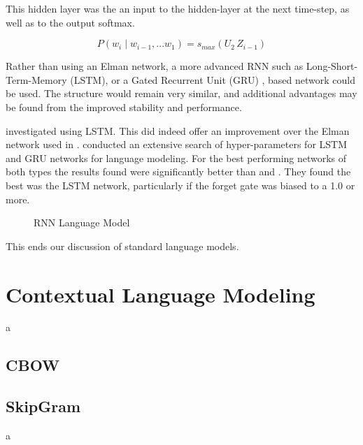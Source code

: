 \documentclass[parskip]{komatufte}
\begin{document}
This hidden layer was the an input to the hidden-layer at the next time-step, as well as to the output softmax.

\begin{equation}
	P(w_i \mid w_{i-1}, ... w_{1}) = s_{max}\left(U_2 \, Z_{i-1} \right)
\end{equation}



Rather than using an Elman network, a more advanced RNN such as Long-Short-Term-Memory (LSTM), or a Gated Recurrent Unit (GRU) , based network could be used.
The structure would remain very similar,
and additional advantages may be found from the improved stability and performance.

 investigated using LSTM.
This did indeed offer an improvement over the Elman network used in \textcite{mikolov2010recurrent}.
 conducted an extensive search of hyper-parameters for LSTM and GRU networks for language modeling.
For the best performing networks of both types the results found were significantly better than \textcite{sundermeyer2012lstm} and \textcite{mikolov2010recurrent}.
They found the best was the LSTM network, particularly if the forget gate was biased to a 1.0 or more.

\begin{figure}
	\centering
	 
	\caption{\label{fig:neural-language-model} RNN Language Model}
\end{figure}

This ends our discussion of standard language models.


\section{Contextual Language Modeling}

 a

\subsection{CBOW}
 
\subsection{SkipGram}
 a
\end{document}
